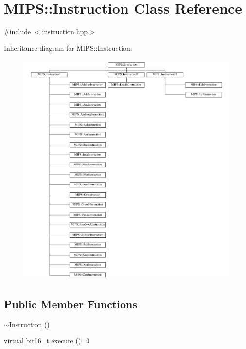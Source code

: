 \hypertarget{classMIPS_1_1Instruction}{}\section{M\+I\+PS\+:\+:Instruction Class Reference}
\label{classMIPS_1_1Instruction}


{\ttfamily \#include $<$instruction.\+hpp$>$}

Inheritance diagram for M\+I\+PS\+:\+:Instruction\+:\begin{figure}[H]
\begin{center}
\leavevmode
\includegraphics[height=12.000000cm]{classMIPS_1_1Instruction}
\end{center}
\end{figure}
\subsection*{Public Member Functions}
\begin{DoxyCompactItemize}
\item 
\hyperlink{classMIPS_1_1Instruction_ab99cb1c89cd950412585375681b1466d}{$\sim$\+Instruction} ()
\item 
virtual \hyperlink{core_8hpp_adc265a970bc35995b5879784bbb3f1b7}{bit16\+\_\+t} \hyperlink{classMIPS_1_1Instruction_a88668dfaf49dd8608f210ba13948d242}{execute} ()=0
\end{DoxyCompactItemize}
